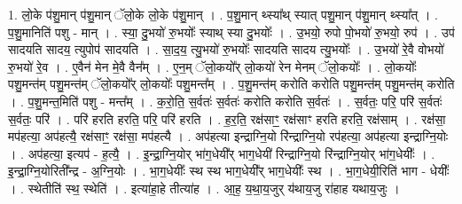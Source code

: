 \documentclass[17pt]{extarticle}
\begin{document}
1. लो॒के प॑शु॒मान् प॑शु॒मान् ॅलो॒के लो॒के प॑शु॒मान् । . प॒शु॒मान् थ्स्या᳚थ् स्यात् पशु॒मान् प॑शु॒मान् थ्स्या᳚त् । . प॒शु॒मानिति॑ पशु - मान् । . स्या॒ दु॒भयो॑ रु॒भयोः᳚ स्याथ् स्या दु॒भयोः᳚ । . उ॒भयो॒ रुपो पो॒भयो॑ रु॒भयो॒ रुप॑ । . उप॑ सादयति सादय॒ त्युपोप॑ सादयति । . सा॒द॒य॒ त्यु॒भयो॑ रु॒भयोः᳚ सादयति सादय त्यु॒भयोः᳚ । . उ॒भयो॑ रे॒वै वोभयो॑ रु॒भयो॑ रे॒व । . ए॒वैन॑ मेन मे॒वै वैन᳚म् । . ए॒न॒म् ॅलो॒कयो᳚र् लो॒कयो॑ रेन मेनम् ॅलो॒कयोः᳚ । . लो॒कयोः᳚ पशु॒मन्त॑म् पशु॒मन्त॑म् ॅलो॒कयो᳚र् लो॒कयोः᳚ पशु॒मन्त᳚म् । . प॒शु॒मन्त॑म् करोति करोति पशु॒मन्त॑म् पशु॒मन्त॑म् करोति । . प॒शु॒मन्त॒मिति॑ पशु - मन्त᳚म् । . क॒रो॒ति॒ स॒र्वतः॑ स॒र्वतः॑ करोति करोति स॒र्वतः॑ । . स॒र्वतः॒ परि॒ परि॑ स॒र्वतः॑ स॒र्वतः॒ परि॑ । . परि॑ हरति हरति॒ परि॒ परि॑ हरति । . ह॒र॒ति॒ रक्ष॑साꣳ॒॒ रक्ष॑साꣳ हरति हरति॒ रक्ष॑साम् । . रक्ष॑सा॒ मप॑हत्या॒ अप॑हत्यै॒ रक्ष॑साꣳ॒॒ रक्ष॑सा॒ मप॑हत्यै । . अप॑हत्या इन्द्राग्नि॒यो रि॑न्द्राग्नि॒यो रप॑हत्या॒ अप॑हत्या इन्द्राग्नि॒योः । . अप॑हत्या॒ इत्यप॑ - ह॒त्यै॒ । . इ॒न्द्रा॒ग्नि॒योर् भा॑ग॒धेयी᳚र् भाग॒धेयी॑ रिन्द्राग्नि॒यो रि॑न्द्राग्नि॒योर् भा॑ग॒धेयीः᳚ । . इ॒न्द्रा॒ग्नि॒योरिती᳚न्द्र - अ॒ग्नि॒योः । . भा॒ग॒धेयीः᳚ स्थ स्थ भाग॒धेयी᳚र् भाग॒धेयीः᳚ स्थ । . भा॒ग॒धेयी॒रिति॑ भाग - धेयीः᳚ । . स्थेतीति॑ स्थ॒ स्थेति॑ । . इत्या॑हा॒हे तीत्या॑ह । . आ॒ह॒ य॒था॒य॒जुर् य॑थाय॒जु रा॑हाह यथाय॒जुः । \newline
\end{document}
